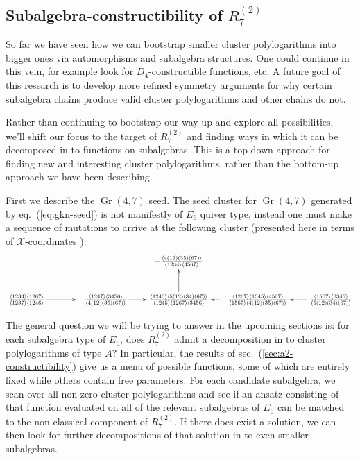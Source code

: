 \documentclass[11pt]{article}
\DeclareMathOperator{\Gr}{Gr}
\def\xcoords{$\mathcal{X}$-coordinates }
\def\pdfeq#1{\texorpdfstring{$#1$}{a}}
\begin{document}
\subsection{Subalgebra-constructibility of \pdfeq{R^{(2)}_7}}

So far we have seen how we can bootstrap smaller cluster polylogarithms into bigger ones via automorphisms and subalgebra structures. One could continue in this vein, for example look for $D_4$-constructible functions, etc. A future goal of this research is to develop more refined symmetry arguments for why certain subalgebra chains produce valid cluster polylogarithms and other chains do not. 

Rather than continuing to bootstrap our way up and explore all possibilities, we'll shift our focus to the target of $R^{(2)}_7$ and finding ways in which it can be decomposed in to functions on subalgebras. This is a top-down approach for finding new and interesting cluster polylogarithms, rather than the bottom-up approach we have been describing. 

First we describe the $\Gr(4,7)$ seed. The seed cluster for $\Gr(4,7)$ generated by eq.~(\ref{eq:gkn-seed}) is not manifestly of $E_6$ quiver type, instead one must make a sequence of mutations to arrive at the following cluster (presented here in terms of \xcoords):
\begin{equation}\label{eq:g47-seed}
\begin{gathered}
\begin{xy} 0;<1pt,0pt>:<0pt,-1pt>::
	(0,50) *+{\frac{\langle 1234\rangle  \langle 1267\rangle }{\langle
   		1237\rangle  \langle 1246\rangle }} ="1",
	(100,50) *+{-\frac{\langle 1247\rangle  \langle 3456\rangle
 	  	}{\langle 4(12)(35)(67)\rangle }} ="2",
	(200,50) *+{\frac{\langle 1246\rangle  \langle 5(12)(34)(67)\rangle
 	  	}{\langle 1245\rangle  \langle 1267\rangle  \langle
   		3456\rangle }} ="3",
	(200,0) *+{-\frac{\langle 4(12)(35)(67)\rangle }{\langle
   		1234\rangle  \langle 4567\rangle }} ="4",
	(300,50) *+{-\frac{\langle 1267\rangle  \langle 1345\rangle  \langle
   		4567\rangle }{\langle 1567\rangle  \langle
   		4(12)(35)(67)\rangle }} ="5",
	(400,50) *+{\frac{\langle 1567\rangle  \langle 2345\rangle }{\langle
   		5(12)(34)(67)\rangle }} ="6",
	"1", {\ar"2"},
	"2", {\ar"3"},
	"3", {\ar"4"},
	"5", {\ar"3"},
	"6", {\ar"5"},
\end{xy}
\end{gathered}
\end{equation}

The general question we will be trying to answer in the upcoming sections is: for each subalgebra type of $E_6$, does $R^{(2)}_7$ admit a decomposition in to cluster polylogarithms of type $A$? In particular, the results of sec.~(\ref{sec:a2-constructibility}) give us a menu of possible functions, some of which are entirely fixed while others contain free parameters. For each candidate subalgebra, we scan over all non-zero cluster polylogarithms and see if an ansatz consisting of that function evaluated on all of the relevant subalgebras of $E_6$ can be matched to the non-classical component of $R^{(2)}_7$. If there does exist a solution, we can then look for further decompositions of that solution in to even smaller subalgebras. 
\end{document}
